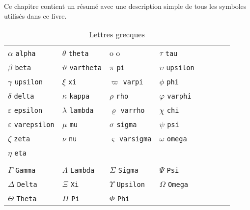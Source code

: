 Ce chapitre contient un résumé avec une description simple de tous les symboles utilisés dans ce livre.

	\begin{table}[H]
	\centering
	\begin{tabular}{*8l}
	$\alpha$ \verb?alpha? &$\theta$ \verb?theta? & o o &$\tau$ \verb?tau? \\
	$\beta$ \verb?beta? &$\vartheta$ \verb?vartheta? &$\pi$ \verb?pi?         &$\upsilon$ \verb?upsilon? \\
	$\gamma$ \verb?upsilon? &$\xi$ \verb?xi?  &$\varpi$ \verb?varpi? &$\phi$ \verb?phi?  \\
	$\delta$ \verb?delta? &$\kappa$ \verb?kappa? &$\rho$ \verb?rho? &$\varphi$ \verb?varphi? \\
	$\varepsilon$ \verb?epsilon? &$\lambda$ \verb?lambda? &$\varrho$ \verb?varrho? &$\chi$ \verb?chi?  \\
	$\varepsilon$ \verb?varepsilon? &$\mu$ \verb?mu? &$\sigma$ \verb?sigma? &$\psi$ \verb?psi? \\
	$\zeta$ \verb?zeta? &$\nu$ \verb?nu? &$\varsigma$ \verb?varsigma? &$\omega$ \verb?omega? \\
	$\eta$ \verb?eta?\\
    \\
	$\Gamma$ \verb?Gamma? &$\Lambda$ \verb?Lambda? &$\Sigma$ \verb?Sigma? &$\Psi$ \verb?Psi? \\
	$\Delta$ \verb?Delta? &$\Xi$ \verb?Xi? &$\Upsilon$ \verb?Upsilon? &$\Omega$ \verb?Omega?\\
	$\Theta$ \verb?Theta? &$\Pi$ \verb?Pi? &$\Phi$ \verb?Phi?
	\end{tabular}
	\caption{Lettres grecques}\label{greek}
	\end{table}

